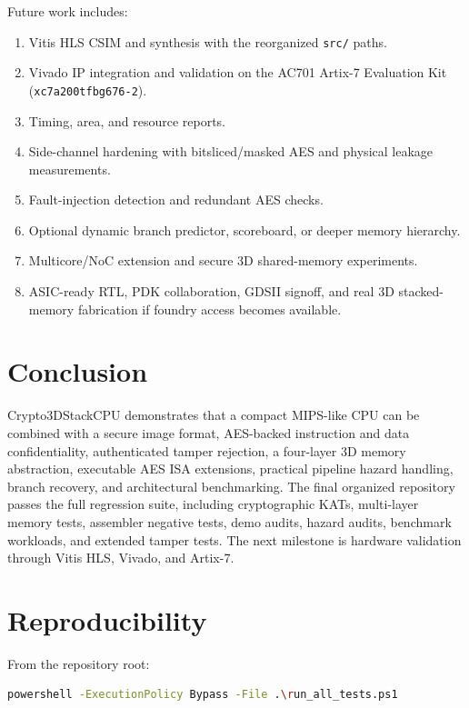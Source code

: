 \documentclass[conference]{IEEEtran}
\begin{document}
Future work includes:

\begin{enumerate}
    \item Vitis HLS CSIM and synthesis with the reorganized \texttt{src/} paths.
    \item Vivado IP integration and validation on the AC701 Artix-7 Evaluation Kit (\texttt{xc7a200tfbg676-2}).
    \item Timing, area, and resource reports.
    \item Side-channel hardening with bitsliced/masked AES and physical leakage measurements.
    \item Fault-injection detection and redundant AES checks.
    \item Optional dynamic branch predictor, scoreboard, or deeper memory hierarchy.
    \item Multicore/NoC extension and secure 3D shared-memory experiments.
    \item ASIC-ready RTL, PDK collaboration, GDSII signoff, and real 3D stacked-memory fabrication if foundry access becomes available.
\end{enumerate}

\section{Conclusion}

Crypto3DStackCPU demonstrates that a compact MIPS-like CPU can be combined with a secure image format, AES-backed instruction and data confidentiality, authenticated tamper rejection, a four-layer 3D memory abstraction, executable AES ISA extensions, practical pipeline hazard handling, branch recovery, and architectural benchmarking. The final organized repository passes the full regression suite, including cryptographic KATs, multi-layer memory tests, assembler negative tests, demo audits, hazard audits, benchmark workloads, and extended tamper tests. The next milestone is hardware validation through Vitis HLS, Vivado, and Artix-7.

\section*{Reproducibility}

From the repository root:

\begin{lstlisting}[language=bash]
powershell -ExecutionPolicy Bypass -File .\run_all_tests.ps1
\end{lstlisting}
\end{document}
